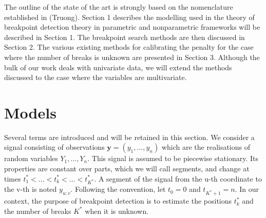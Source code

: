 The outline of the state of the art is strongly based on the nomenclature established in (Truong). Section 1 describes the modelling used in the theory of breakpoint detection theory in parametric and nonparametric frameworks will be described in Section 1. The breakpoint search methods are then discussed in Section 2. The various existing methods for calibrating the penalty for the case where the number of breaks is unknown are presented in Section 3. Although the bulk of our work deals with univariate data, we will extend the methods discussed to the case where the variables are multivariate.


\section{Models}\label{chp2:model}

Several terms are introduced and will be retained in this section. We consider a signal consisting of observations $\bm y = (y_1,...,y_n)$ which are the realisations of random variables $Y_1,...,Y_n$. This signal is assumed to be piecewise stationary. Its properties are constant over parts, which we will call segments, and change at times $t_1^* <... < t_k^* <... < t_{K^*}^*$. A segment of the signal from the u-th coordinate to the v-th is noted $y_{u:v}$. Following the convention, let $t_0 = 0$ and $t_{K^*+1} = n$. In our context, the purpose of breakpoint detection is to estimate the positions $t_k^*$ and the number of breaks $K^*$ when it is unknown. 

